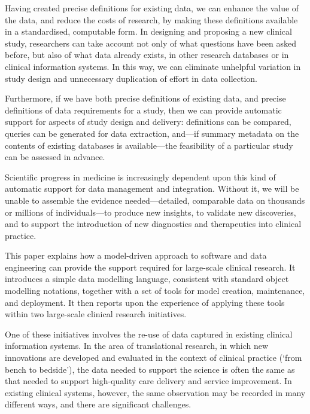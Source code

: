 Having created precise definitions for existing data, we can enhance
the value of the data, and reduce the costs of research, by making
these definitions available in a standardised, computable form.  In
designing and proposing a new clinical study, researchers can take
account not only of what questions have been asked before, but also of
what data already exists, in other research databases or in clinical
information systems.  In this way, we can eliminate unhelpful
variation in study design and unnecessary duplication of effort in
data collection.

Furthermore, if we have both precise definitions of existing data, and
precise definitions of data requirements for a study, then we can
provide automatic support for aspects of study design and delivery:
definitions can be compared, queries can be generated for data
extraction, and---if summary metadata on the contents of existing
databases is available---the feasibility of a particular study can be
assessed in advance.

Scientific progress in medicine is increasingly dependent upon this
kind of automatic support for data management and integration.
Without it, we will be unable to assemble the evidence
needed---detailed, comparable data on thousands or millions of
individuals---to produce new insights, to validate new discoveries,
and to support the introduction of new diagnostics and therapeutics
into clinical practice.

\clearpage

This paper explains how a model-driven approach to software and data
engineering can provide the support required for large-scale clinical
research.  It introduces a simple data modelling language, consistent
with standard object modelling notations, together with a set of tools
for model creation, maintenance, and deployment.  It then reports upon
the experience of applying these tools within two large-scale clinical
research initiatives.

One of these initiatives involves the re-use of data captured in
existing clinical information systems.  In the area of translational
research, in which new innovations are developed and evaluated in the
context of clinical practice (`from bench to bedside'), the data
needed to support the science is often the same as that needed to
support high-quality care delivery and service improvement.  In
existing clinical systems, however, the same observation may be
recorded in many different ways, and there are significant
challenges. 


